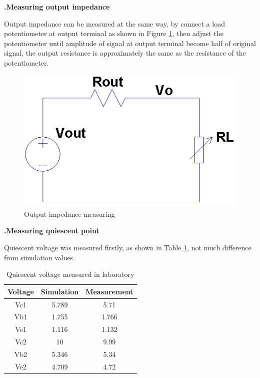 \documentclass[a4paper,notitlepage,10pt]{report}
\newcommand{\tab}{\hspace{0.75cm}}
\newcommand{\fontSubHeading}{\fontsize{10pt}{11pt}\selectfont}
\newcommand{\fontBody}{\fontsize{10pt}{11pt}\selectfont}
\newcommand{\sepTable}{\setlength{\intextsep}{12pt}}
\newcommand{\sepFigure}{\setlength{\intextsep}{10pt}}
\newenvironment{nscenter}
	{\parskip=0pt\par\centering}
	{\par\noindent\ignorespacesafterend}
\newcounter{sections}
\newcounter{subsections}[sections]
\begin{document}
\begin{multicols}{2}
\fontSubHeading
{}
\textbf{.\tab Measuring output impedance}

Output impedance can be measured at the same way, by connect a load potentiometer at output terminal as shown in Figure \ref{fig:outputimp}, then adjust the potentiometer until amplitude of signal at output terminal become half of original signal, the output resistance is approximately the same as the resistance of the potentiometer.
\parskip=0pt

\begin{figure}[H]
	\centering
	\includegraphics[width=\columnwidth]{outputimp}
	\caption{Output impedance measuring}
	\label{fig:outputimp}
\end{figure}
\parskip=6pt

\fontSubHeading
{}
\textbf{.\tab Measuring quiescent point}

\fontBody
Quiescent voltage was measured firstly, as shown in Table \ref{tb:qv}, not much difference from simulation values.
\parskip=0pt\par
\sepTable
\begin{table}[H]
\caption{Quiescent voltage measured in laboratory}
\label{tb:qv}
\begin{nscenter}
\begin{tabular}{c | c | c}
	\hline
	Voltage & Simulation & Measurement \\ \hline
	Vc1	& 5.789	& 5.71	\\
	Vb1	& 1.755	& 1.766	\\
	Ve1	& 1.116	& 1.132	\\
	Vc2	& 10	& 9.99	\\
	Vb2	& 5.346	& 5.34	\\
	Ve2	& 4.709	& 4.72	\\ \hline
\end{tabular}
\end{nscenter}
\end{table}
\sepFigure
\parskip=6pt


\end{multicols}
\end{document}

